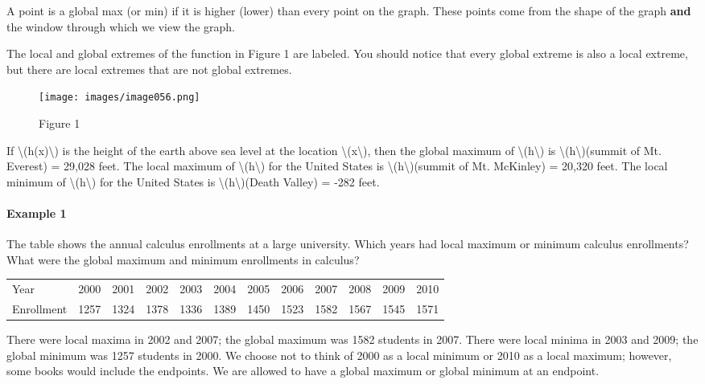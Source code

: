 A point is a global max (or min) if it is higher (lower) than every
point on the graph. These points come from the shape of the graph
\textbf{and} the window through which we view the graph.

The local and global extremes of the function in Figure 1 are labeled.
You should notice that every global extreme is also a local extreme, but
there are local extremes that are not global extremes.

\begin{figure}
\centering
\texttt{[image: images/image056.png]}
\caption{Figure 1}
\end{figure}

If \textbackslash{}(h(x)\textbackslash{}) is the height of the earth
above sea level at the location \textbackslash{}(x\textbackslash{}),
then the global maximum of \textbackslash{}(h\textbackslash{}) is
\textbackslash{}(h\textbackslash{})(summit of Mt. Everest) = 29,028
feet. The local maximum of \textbackslash{}(h\textbackslash{}) for the
United States is \textbackslash{}(h\textbackslash{})(summit of Mt.
McKinley) = 20,320 feet. The local minimum of
\textbackslash{}(h\textbackslash{}) for the United States is
\textbackslash{}(h\textbackslash{})(Death Valley) = -282 feet.

\hypertarget{example-1}{%
\paragraph{Example 1}\label{example-1}}

The table shows the annual calculus enrollments at a large university.
Which years had local maximum or minimum calculus enrollments? What were
the global maximum and minimum enrollments in calculus?

\begin{longtable}[]{@{}llllllllllll@{}}
\toprule
\endhead
Year & 2000 & 2001 & 2002 & 2003 & 2004 & 2005 & 2006 & 2007 & 2008 &
2009 & 2010\tabularnewline
Enrollment & 1257 & 1324 & 1378 & 1336 & 1389 & 1450 & 1523 & 1582 &
1567 & 1545 & 1571\tabularnewline
\bottomrule
\end{longtable}

There were local maxima in 2002 and 2007; the global maximum was 1582
students in 2007. There were local minima in 2003 and 2009; the global
minimum was 1257 students in 2000. We choose not to think of 2000 as a
local minimum or 2010 as a local maximum; however, some books would
include the endpoints. We are allowed to have a global maximum or global
minimum at an endpoint.

